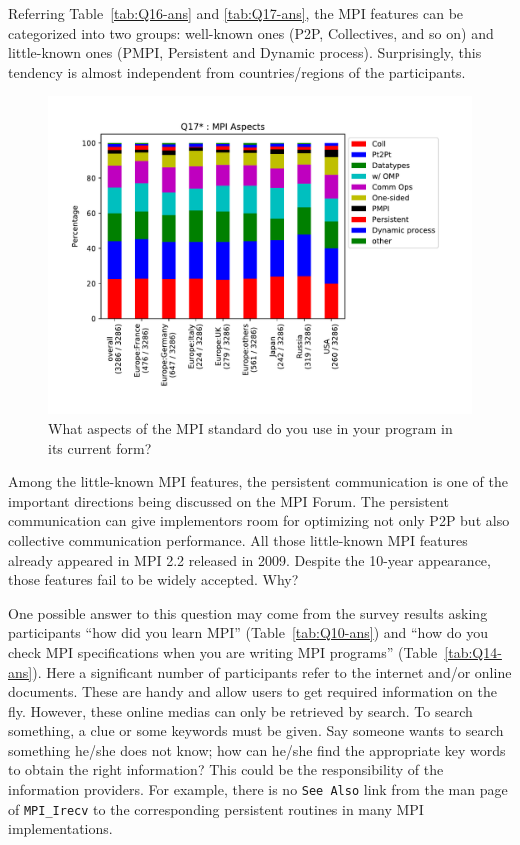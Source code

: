\documentclass[sigconf,nonacm]{acmart}
\begin{document}
Referring Table~\ref{tab:Q16-ans} and \ref{tab:Q17-ans}, the MPI
features can be categorized into two groups: well-known ones (P2P,
Collectives, and so on) and little-known ones (PMPI, Persistent and
Dynamic process). Surprisingly, this tendency is almost independent
from countries/regions of the participants.

\begin{figure}[bht]
\begin{center}
\includegraphics[width=0.8\hsize]{figs/Q17-S.pdf}
\caption{What aspects of the MPI standard do you use in your program in its current form?}%
\label{fig:Q17}
\end{center}
\end{figure}

Among the little-known MPI features, the persistent communication is
one of the important directions being discussed on the MPI Forum\cite{mpi-forum}.
The persistent communication can give implementors room for
optimizing not only P2P but also collective communication
performance.
All those little-known MPI features already appeared in MPI 2.2
released in 2009. Despite the 10-year appearance, those features
fail to be widely accepted.  Why?

One possible answer to this question may come from the survey results
asking participants ``how did you learn MPI''
(Table~\ref{tab:Q10-ans}) and ``how do you check
MPI specifications when you are writing MPI programs''
(Table~\ref{tab:Q14-ans}).
Here a significant number of participants refer to the internet
and/or online documents. These are handy and allow users to get
required information on the fly. However,
these online medias can only be retrieved by
search. To search something, a clue or some keywords must be given.
Say someone wants to search something he/she does not know; how can he/she
find the appropriate key words to obtain the right information?
This could be the responsibility of the information providers. For example,
there is no {\tt See Also} link from the man page of {\tt MPI\_Irecv}
to the corresponding persistent routines in many MPI implementations.
\end{document}

